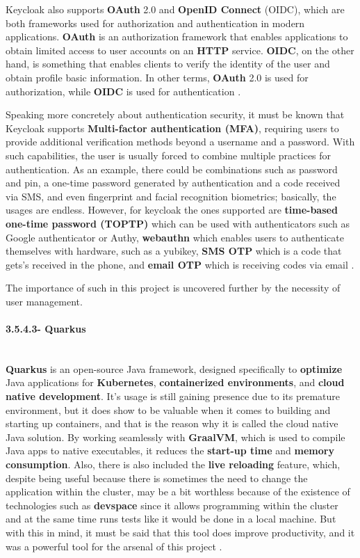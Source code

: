 Keycloak also supports \textbf{OAuth} 2.0 and \textbf{OpenID Connect} (OIDC), which are both frameworks used for authorization and authentication in modern applications. \textbf{OAuth} is an authorization framework that enables applications to obtain limited access to user accounts on an \textbf{HTTP} service. \textbf{OIDC}, on the other hand, is something that enables clients to verify the identity of the user and obtain profile basic information. In other terms, \textbf{OAuth} 2.0 is used for authorization, while \textbf{OIDC} is used for authentication\cite{oauth2.0} \cite{openid} \cite{jwt}.

Speaking more concretely about authentication security, it must be known that Keycloak supports \textbf{Multi-factor authentication (MFA)}, requiring users to provide additional verification methods beyond a username and a password. With such capabilities, the user is usually forced to combine multiple practices for authentication. As an example, there could be combinations such as password and pin, a one-time password generated by authentication and a code received via SMS, and even fingerprint and facial recognition biometrics; basically, the usages are endless. However, for keycloak the ones supported are \textbf{time-based one-time password (TOPTP)} which can be used with authenticators such as Google authenticator or Authy, \textbf{webauthn} which enables users to authenticate themselves with hardware, such as a yubikey, \textbf{SMS OTP} which is a code that gets's received in the phone, and \textbf{email OTP} which is receiving codes via email \cite{MFA}.

The importance of such in this project is uncovered further by the necessity of user management.

\paragraph{3.5.4.3- Quarkus}\mbox{}\\
\textbf{Quarkus} is an open-source Java framework, designed specifically to \textbf{optimize} Java applications for \textbf{Kubernetes}, \textbf{containerized environments}, and \textbf{cloud native development}. It's usage is still gaining presence due to its premature environment, but it does show to be valuable when it comes to building and starting up containers, and that is the reason why it is called the cloud native Java solution. By working seamlessly with \textbf{GraalVM}, which is used to compile Java apps to native executables, it reduces the \textbf{start-up time} and \textbf{memory consumption}. Also, there is also included the \textbf{live reloading} feature, which, despite being useful because there is sometimes the need to change the application within the cluster, may be a bit worthless because of the existence of technologies such as \textbf{devspace} since it allows programming within the cluster and at the same time runs tests like it would be done in a local machine. But with this in mind, it must be said that this tool does improve productivity, and it was a powerful tool for the arsenal of this project \cite{quarkus} \cite{quarkus2}.

